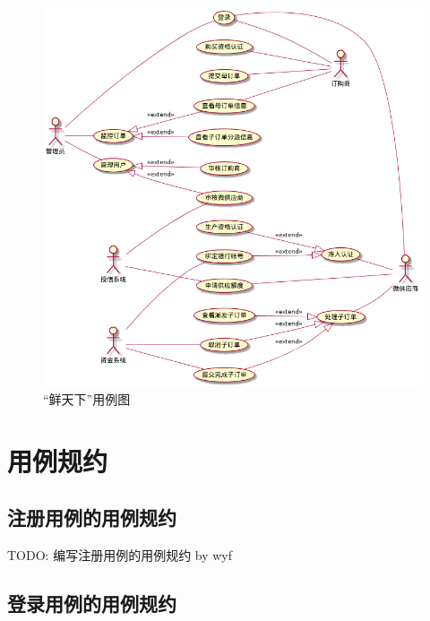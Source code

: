 \begin{figure}[htp]
    \centering
    \includegraphics[width=17cm]{figure/usecase/uc_main_ver1.png}
    \caption{“鲜天下”用例图}
    \label{fig:usecase-main}
\end{figure}


\section{用例规约}

\subsection{注册用例的用例规约}

TODO: 编写注册用例的用例规约  by wyf

\subsection{登录用例的用例规约}


